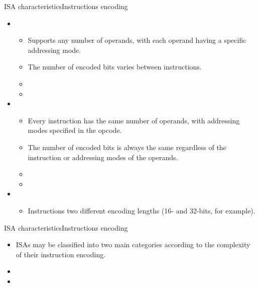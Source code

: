 \documentclass[]{slides}
\begin{document}
\begin{frame}{\acs{ISA} characteristics}{Instructions encoding}
\begin{itemize}
  \item {} 
 \begin{itemize}
    \item Supports any number of operands, with each operand having a specific addressing mode.
    \item The number of encoded bits varies between instructions.
    \item {}
    \item {}
  \end{itemize}
  \item {} 
  \begin{itemize}
    \item Every instruction has the same number of operands, with addressing modes specified in the opcode.
    \item The number of encoded bits is always the same regardless of the instruction or addressing modes of the operands.
    \item {}
    \item {}
  \end{itemize}
  \item {}
  \begin{itemize}
  \item Instructions two different encoding lengths (16- and 32-bits, for example).
  \end{itemize}
\end{itemize}   
\end{frame}

\begin{frame}{\acs{ISA} characteristics}{Instructions encoding}
  \begin{itemize}
    \item \acp{ISA} may be classified into two main categories according to the complexity of their instruction encoding.
    \item {}
    \item {}
  \end{itemize}     
\end{frame}
\end{document}
